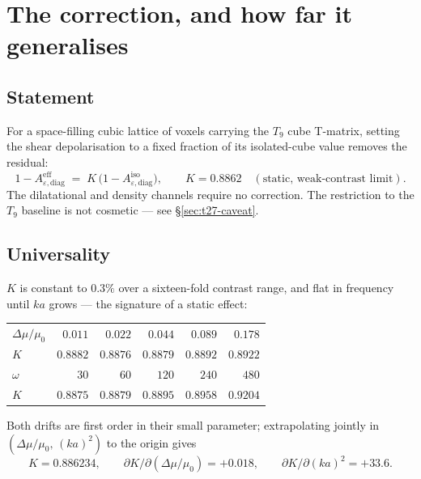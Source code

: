 \documentclass[11pt,a4paper]{article}
\newcommand{\Dmu}{\Delta\mu}
\newcommand{\Kren}{K}
\begin{document}
\section{The correction, and how far it generalises}

\subsection{Statement}

\begin{tcolorbox}[colback=blue!4,colframe=blue!50!black,
  title={The shear-channel correction, $T_9$ baseline}]
For a space-filling cubic lattice of voxels carrying the $T_9$ cube T-matrix,
setting the shear depolarisation to a fixed fraction of its isolated-cube value
removes the residual:
\[
  1-A^{\text{eff}}_{\varepsilon,\text{diag}}
  \;=\; \Kren\,\bigl(1-A^{\text{iso}}_{\varepsilon,\text{diag}}\bigr),
  \qquad
  \Kren = 0.8862 \quad(\text{static, weak-contrast limit}).
\]
The dilatational and density channels require no correction. The restriction to
the $T_9$ baseline is not cosmetic --- see \S\ref{sec:t27-caveat}.
\end{tcolorbox}

\subsection{Universality}

$\Kren$ is constant to $0.3\%$ over a sixteen-fold contrast range, and flat in
frequency until $ka$ grows --- the signature of a static effect:

\begin{center}
\begin{tabular}{lrrrrr}
\toprule
$\Dmu/\mu_0$ & $0.011$ & $0.022$ & $0.044$ & $0.089$ & $0.178$ \\
$\Kren$ & $0.8882$ & $0.8876$ & $0.8879$ & $0.8892$ & $0.8922$ \\
\midrule
$\omega$ & $30$ & $60$ & $120$ & $240$ & $480$ \\
$\Kren$ & $0.8875$ & $0.8879$ & $0.8895$ & $0.8958$ & $0.9204$ \\
\bottomrule
\end{tabular}
\end{center}

Both drifts are first order in their small parameter; extrapolating jointly in
$(\Dmu/\mu_0,\,(ka)^2)$ to the origin gives
\[
  \Kren = 0.886234,
  \qquad
  \partial \Kren/\partial(\Dmu/\mu_0) = +0.018,
  \qquad
  \partial \Kren/\partial (ka)^2 = +33.6 .
\]
\end{document}
